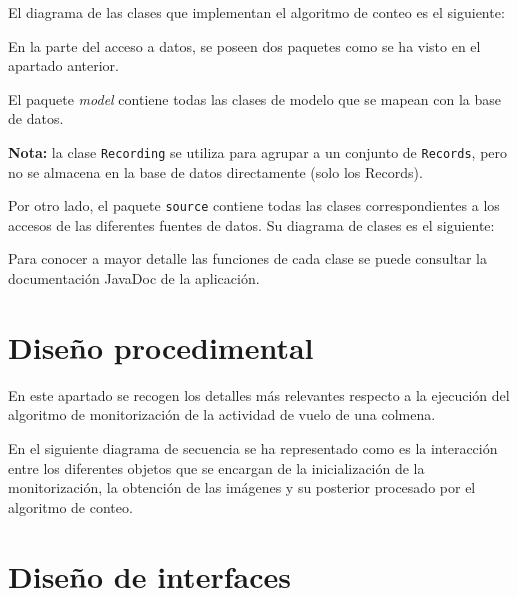 \newpage
El diagrama de las clases que implementan el algoritmo de conteo es el
siguiente:

\newpage
En la parte del acceso a datos, se poseen dos paquetes como se ha visto
en el apartado anterior.


El paquete \emph{model} contiene todas las clases de modelo que se
mapean con la base de datos.

\newpage
\textbf{Nota:} la clase \texttt{Recording} se utiliza para agrupar a un conjunto de \texttt{Records},
pero no se almacena en la base de datos directamente (solo los Records).

Por otro lado, el paquete \texttt{source} contiene todas las clases
correspondientes a los accesos de las diferentes fuentes de datos. Su
diagrama de clases es el siguiente:


Para conocer a mayor detalle las funciones de cada clase se puede
consultar la documentación JavaDoc de la aplicación.

\section{Diseño procedimental}\label{diseno-procedimental}

En este apartado se recogen los detalles más relevantes respecto a la
ejecución del algoritmo de monitorización de la actividad de vuelo de
una colmena.

En el siguiente diagrama de secuencia se ha representado como es la
interacción entre los diferentes objetos que se encargan de la
inicialización de la monitorización, la obtención de las imágenes y su
posterior procesado por el algoritmo de conteo.

\begin{landscape}
\end{landscape}

\section{Diseño de interfaces}\label{diseno-de-interfaces}

